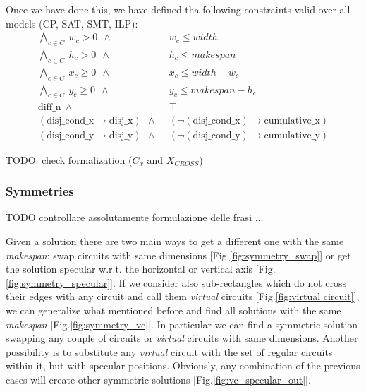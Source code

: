     Once we have done this, we have defined tha following constraints valid over all models (CP, SAT, SMT, ILP):
    \begin{align*}
        \bigwedge_{c \in C}\ w_c > 0\ \    \land\                   &\ w_c \leq width \\
        \bigwedge_{c \in C}\ h_c > 0\ \   \land\                    &\ h_c \leq makespan \\
        \bigwedge_{c \in C}\ x_c \geq 0\ \ \land\                   &\ x_c \leq width - w_c \\
        \bigwedge_{c \in C}\ y_c \geq 0\ \ \land\                   &\ y_c \leq makespan - h_c \\
        \text{diff\_n}\ \ \land\ &\ \top \\
        (\text{disj\_cond\_x} \rightarrow \text{disj\_x})\ \ \land\ &\ (\neg (\text{disj\_cond\_x}) \rightarrow \text{cumulative\_x}) \\
        (\text{disj\_cond\_y} \rightarrow \text{disj\_y})\ \ \land\ &\ (\neg (\text{disj\_cond\_y}) \rightarrow \text{cumulative\_y})
    \end{align*}
    
    \colorbox{BurntOrange}{TODO: check formalization ($C_x$ and $X_{CROSS}$)}

    \subsubsection{Symmetries} \label{sec:symmetries}
    \colorbox{BurntOrange}{TODO controllare assolutamente formulazione delle frasi ...}


        Given a solution there are two main ways to get a different one with the same \textit{makespan}:
        swap circuits with same dimensions [Fig.\ref{fig:symmetry_swap}] or get the solution specular w.r.t. the horizontal 
        or vertical axis [Fig.\ref{fig:symmetry_specular}].
        If we consider also sub-rectangles which do not cross their edges with any circuit and call them 
        \textit{virtual} circuits [Fig.\ref{fig:virtual circuit}], we can generalize what mentioned before and find all solutions with 
        the same \textit{makespan} [Fig.\ref{fig:symmetry_vc}].
        In particular we can find a symmetric solution swapping any couple of circuits or \textit{virtual} circuits 
        with same dimensions. Another possibility is to substitute any \textit{virtual} circuit with the set of regular circuits within it, 
        but with specular positions. Obviously, any combination of the previous cases will create other symmetric 
        solutions [Fig.\ref{fig:vc_specular_out}].

